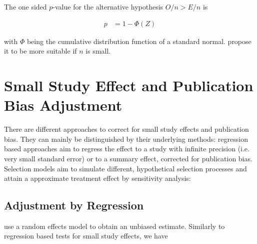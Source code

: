 The one sided $p$-value for the alternative hypothesis $O/n > E/n$ is

\begin{align}
p &= 1 - \Phi(Z) \nonumber
\end{align}

with $\Phi$ being the cumulative distribution function of a standard normal. \citet{excess.significance} propose it to be more suitable if $n$ is small.











\section{Small Study Effect and Publication Bias Adjustment}
There are different approaches to correct for small study effects and publication bias. They can mainly be distinguished by their underlying methods: regression based approaches aim to regress the effect to a study with infinite precision (i.e. very small standard error) or to a summary effect, corrected for publication bias. Selection models aim to simulate different, hypothetical selection processes and attain a approximate treatment effect by sensitivity analysis:

\subsection{Adjustment by Regression}
\citet{limitmeta} use a random effects model %
to obtain an unbiased estimate. Similarly to 
regression based tests for small study effects, we have

